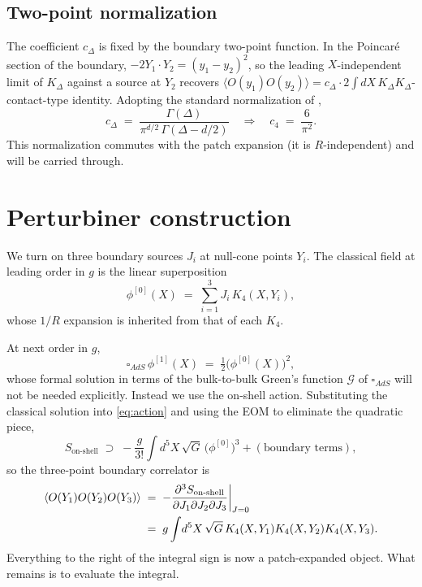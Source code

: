 \documentclass[11pt]{article}
\newcommand{\bdy}{\partial}
\renewcommand{\Box}{\square}
\begin{document}
\subsection{Two-point normalization}

The coefficient $c_\Delta$ is fixed by the boundary two-point function. In the Poincar\'e section of the boundary, $-2Y_1\cdot Y_2 = (y_1-y_2)^2$, so the leading $X$-independent limit of $K_\Delta$ against a source at $Y_2$ recovers $\langle O(y_1) O(y_2)\rangle = c_\Delta\cdot 2\!\int\! dX\,K_\Delta K_\Delta$-contact-type identity. Adopting the standard normalization of \cite{Freedman:1998tz},
\begin{equation}
    c_\Delta \;=\; \frac{\Gamma(\Delta)}{\pi^{d/2}\,\Gamma(\Delta-d/2)} \quad\Longrightarrow\quad c_4 \;=\; \frac{6}{\pi^2}.
\end{equation}
This normalization commutes with the patch expansion (it is $R$-independent) and will be carried through.

\section{Perturbiner construction}\label{sec:perturbiner}

We turn on three boundary sources $J_i$ at null-cone points $Y_i$. The classical field at leading order in $g$ is the linear superposition
\begin{equation}
    \phi^{[0]}(X) \;=\; \sum_{i=1}^3 J_i\, K_4(X,Y_i),
\end{equation}
whose $1/R$ expansion is inherited from that of each $K_4$.

At next order in $g$,
\begin{equation}
    \Box_{AdS}\,\phi^{[1]}(X) \;=\; \tfrac12\bigl(\phi^{[0]}(X)\bigr)^2,
\end{equation}
whose formal solution in terms of the bulk-to-bulk Green's function $\mathcal{G}$ of $\Box_{AdS}$ will not be needed explicitly. Instead we use the on-shell action. Substituting the classical solution into \cref{eq:action} and using the EOM to eliminate the quadratic piece,
\begin{equation}
    S_{\text{on-shell}} \;\supset\; -\frac{g}{3!}\int\! d^5X\,\sqrt{G}\,\bigl(\phi^{[0]}\bigr)^3 + (\text{boundary terms}),
    \label{eq:onshell}
\end{equation}
so the three-point boundary correlator is
\begin{align}
    \langle O(Y_1)O(Y_2)O(Y_3)\rangle &\;=\; -\frac{\bdy^3 S_{\text{on-shell}}}{\bdy J_1 \bdy J_2 \bdy J_3}\bigg|_{J=0} \notag\\
    &\;=\; g\int\! d^5X\,\sqrt{G}\,K_4(X,Y_1)K_4(X,Y_2)K_4(X,Y_3).
    \label{eq:three-pt}
\end{align}
Everything to the right of the integral sign is now a patch-expanded object. What remains is to evaluate the integral.
\end{document}
